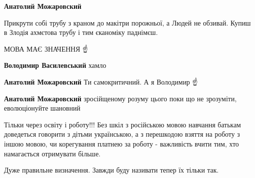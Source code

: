 \begin{itemize}
\begin{itemize}
\textbf{Анатолий Можаровский} 

Прикрути собі трубу з краном до макітри порожньої, а Людей не обзивай. Купиш в
Злодія ахмєтова трубу і тим єканоміку паднімєш.

МОВА МАЄ ЗНАЧЕННЯ ☝️

 
\textbf{Володимир Василевський} хамло

 
\textbf{Анатолий Можаровский} Ти самокритичний. А я Володимир ☝️

 
\textbf{Анатолий Можаровский} зросійщеному розуму цього поки що не зрозуміти, еволюціонуйте шановний
\end{itemize}

 

Тільки через освіту і роботу!!! Без шкіл з російською мовою навчання батькам
доведеться говорити з дітьми українською, а з перешкодою взяття на роботу з
іншою мовою, чи корегування платнею за роботу - важливість вчити тим, хто
намагається отримувати більше.


 

Дуже правильне визначення. Завжди буду називати тепер їх тільки так.



\end{itemize}
